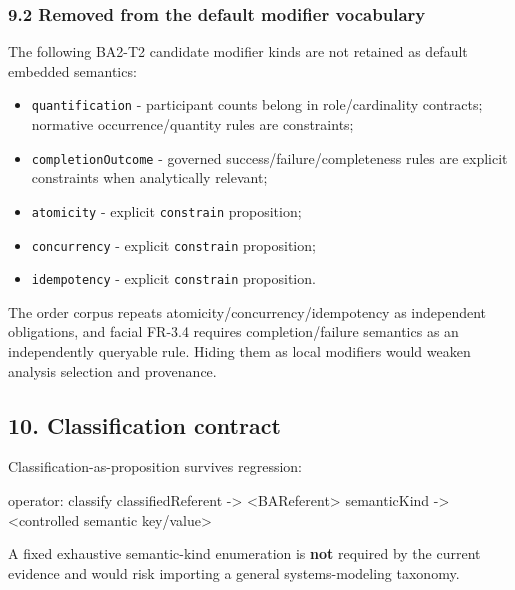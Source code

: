 \documentclass[
  10pt,
  a4paper,
]{article}
\newenvironment{Shaded}{}{}
\newcommand{\NormalTok}[1]{#1}
\providecommand{\tightlist}{%
  \setlength{\itemsep}{0pt}\setlength{\parskip}{0pt}}
\begin{document}
\subsubsection{9.2 Removed from the default modifier
vocabulary}\label{92-removed-from-the-default-modifier-vocabulary}

The following BA2-T2 candidate modifier kinds are not retained as
default embedded semantics:

\begin{itemize}
\tightlist
\item
  \texttt{quantification} - participant counts belong in
  role/cardinality contracts; normative occurrence/quantity rules are
  constraints;
\item
  \texttt{completionOutcome} - governed success/failure/completeness
  rules are explicit constraints when analytically relevant;
\item
  \texttt{atomicity} - explicit \texttt{constrain} proposition;
\item
  \texttt{concurrency} - explicit \texttt{constrain} proposition;
\item
  \texttt{idempotency} - explicit \texttt{constrain} proposition.
\end{itemize}

The order corpus repeats atomicity/concurrency/idempotency as
independent obligations, and facial FR-3.4 requires completion/failure
semantics as an independently queryable rule. Hiding them as local
modifiers would weaken analysis selection and provenance.

\subsection{10. Classification
contract}\label{10-classification-contract}

Classification-as-proposition survives regression:

\begin{Shaded}
\begin{Highlighting}[]
\NormalTok{operator: classify}
\NormalTok{classifiedReferent {-}\textgreater{} \textless{}BAReferent\textgreater{}}
\NormalTok{semanticKind       {-}\textgreater{} \textless{}controlled semantic key/value\textgreater{}}
\end{Highlighting}
\end{Shaded}

A fixed exhaustive semantic-kind enumeration is \textbf{not} required by
the current evidence and would risk importing a general systems-modeling
taxonomy.
\end{document}
